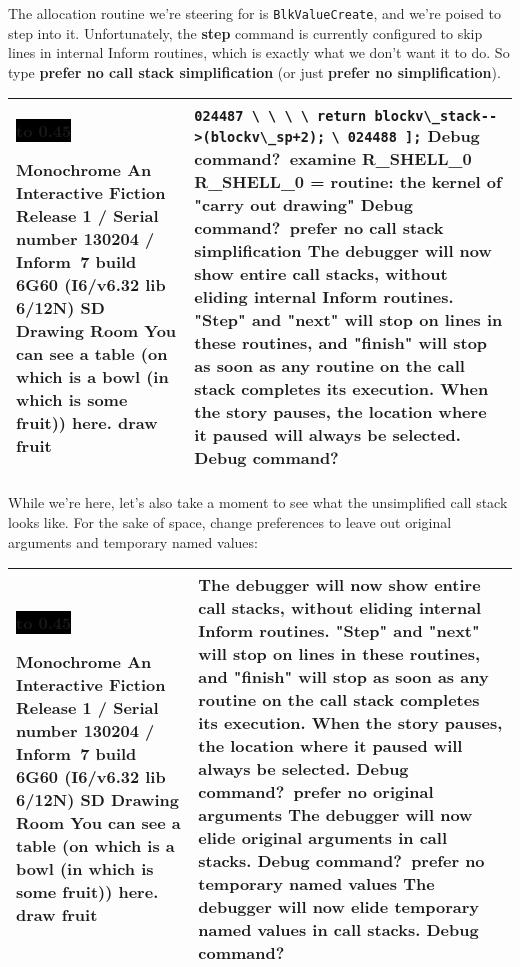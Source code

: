 \documentclass{book}
\newcommand{\n}{\hspace*{\fill}\newline}
\newcommand{\terp}[2]{\begin{center}\begin{tabular}{p{0.45\textwidth}|p{0.45\textwidth}}\midrule #1&#2\\\midrule\end{tabular}\end{center}}
\newcommand{\glkheading}[1]{\textbf{#1}}
\newcommand{\glkinput}[1]{\textbf{#1}}
\newcommand{\glkstatusline}[2]{\centerline{\colorbox{black}{\hbox to 0.45\textwidth{\textcolor{white}{#1\hfil #2}}}}}
\newcommand{\storyprompt}{\raisebox{1.5pt}{\(>\)}}
\newcommand{\cursor}{\raisebox{-1.5pt}{\RectangleThin}}
\newcommand{\unmarkedindent}{\hphantom{\(>\)}}
\newcommand{\unmarkedindentb}{\qquad\hphantom{\(>\)}}
\begin{document}
The allocation routine we're steering for is \lstinline{BlkValueCreate}, and
we're poised to step into it.  Unfortunately, the \glkinput{step} command is
currently configured to skip lines in internal Inform routines, which is exactly
what we don't want it to do.  So type \glkinput{prefer no call stack
  simplification} (or just \glkinput{prefer no simplification}).

\terp{\glkstatusline{Drawing Room}{0/1}\n
  \glkheading{Monochrome}\n
  An Interactive Fiction\n
  Release 1 / Serial number 130204 / Inform~7 build 6G60 (I6/v6.32 lib 6/12N) SD\n
  \n
  \glkheading{Drawing Room}\n
  You can see a table (on which is a bowl (in which is some fruit)) here.\n
  \n
  \storyprompt\glkinput{draw fruit}}{%
  \unmarkedindentb \lstinline{024487 \ \ \ \ return blockv\_stack-->(blockv\_sp+2);}\n
  \unmarkedindent \lstinline{\ 024488 ];}\n
  \n
  Debug command?\ \glkinput{examine R\_SHELL\_0}\n
  \n
  R\_SHELL\_0 = routine: the kernel of "carry out drawing"\n
  \n
  Debug command?\ \glkinput{prefer no call stack simplification}\n
  \n
  The debugger will now show entire call stacks, without eliding internal Inform routines.  "Step" and "next" will stop on lines in these routines, and "finish" will stop as soon as any routine on the call stack completes its execution.  When the story pauses, the location where it paused will always be selected.\n
  \n
  Debug command?\ \cursor}

While we're here, let's also take a moment to see what the unsimplified call
stack looks like.  For the sake of space, change preferences to leave out
original arguments and temporary named values:

\terp{\glkstatusline{Drawing Room}{0/1}\n
  \glkheading{Monochrome}\n
  An Interactive Fiction\n
  Release 1 / Serial number 130204 / Inform~7 build 6G60 (I6/v6.32 lib 6/12N) SD\n
  \n
  \glkheading{Drawing Room}\n
  You can see a table (on which is a bowl (in which is some fruit)) here.\n
  \n
  \storyprompt\glkinput{draw fruit}}{%
  The debugger will now show entire call stacks, without eliding internal Inform routines.  "Step" and "next" will stop on lines in these routines, and "finish" will stop as soon as any routine on the call stack completes its execution.  When the story pauses, the location where it paused will always be selected.\n
  \n
  Debug command?\ \glkinput{prefer no original arguments}\n
  \n
  The debugger will now elide original arguments in call stacks.\n
  \n
  Debug command?\ \glkinput{prefer no temporary named values}\n
  \n
  The debugger will now elide temporary named values in call stacks.\n
  \n
  Debug command?\ \cursor}
\end{document}
